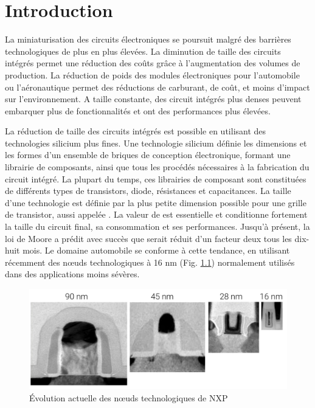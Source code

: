 \chapter{Introduction}

La miniaturisation des circuits électroniques se poursuit malgré des barrières technologiques de plus en plus élevées.
La diminution de taille des circuits intégrés permet une réduction des coûts grâce à l'augmentation des volumes de production.
La réduction de poids des modules électroniques pour l'automobile ou l'aéronautique permet des réductions de carburant, de coût, et moins d'impact sur l'environnement.
A taille constante, des circuit intégrés plus denses peuvent embarquer plus de fonctionnalités et ont des performances plus élevées.

La réduction de taille des circuits intégrés est possible en utilisant des technologies silicium plus fines.
Une technologie silicium définie les dimensions et les formes d'un ensemble de briques de conception électronique, formant une librairie de composants, ainsi que tous les procédés nécessaires à la fabrication du circuit intégré.
La plupart du temps, ces librairies de composant sont constituées de différents types de transistors, diode, résistances et capacitances.
La taille d'une technologie est définie par la plus petite dimension possible pour une grille de transistor, aussi appelée \textlambda.
La valeur de \textlambda est essentielle et conditionne fortement la taille du circuit final, sa consommation et ses performances.
Jusqu'à présent, la loi de Moore a prédit avec succès que \textlambda serait réduit d'un facteur deux tous les dix-huit mois.
Le domaine automobile se conforme à cette tendance, en utilisant récemment des nœuds technologiques à 16 nm (Fig. \ref{fig:nxp-techno-increase}) \cite{evolution_technologies} normalement utilisés dans des applications moins sévères.

\begin{figure}[!h]
  \centering
  \includegraphics[width=\textwidth]{src/1/figures/technology_evolution.pdf}
  \caption{Évolution actuelle des nœuds technologiques de NXP \cite{evolution_technologies}}
  \label{fig:nxp-techno-increase}
\end{figure}

